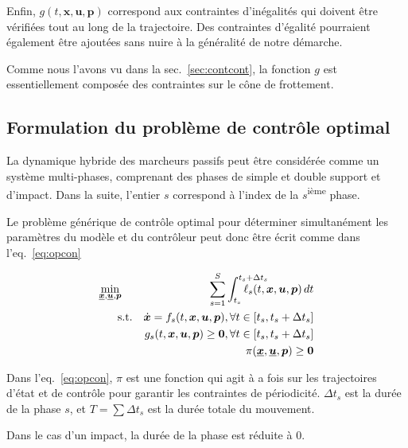 \documentclass[french,A4paper,]{book}
\begin{document}
Enfin, \(g(t, \bm x, \bm u, \bm p)\) correspond aux contraintes
d'inégalités qui doivent être vérifiées tout au long de la trajectoire.
Des contraintes d'égalité pourraient également être ajoutées sans nuire
à la généralité de notre démarche.

Comme nous l'avons vu dans la sec.~\ref{sec:contcont}, la fonction \(g\)
est essentiellement composée des contraintes sur le cône de frottement.

\subsection{Formulation du problème de contrôle
optimal}\label{formulation-du-probluxe8me-de-contruxf4le-optimal}

La dynamique hybride des marcheurs passifs peut être considérée comme un
système multi-phases, comprenant des phases de simple et double support
et d'impact. Dans la suite, l'entier \(s\) correspond à l'index de la
\(s\)\textsuperscript{ième} phase.

Le problème générique de contrôle optimal pour déterminer simultanément
les paramètres du modèle et du contrôleur peut donc être écrit comme
dans l'eq.~\ref{eq:opcon}

\begin{equation}\begin{aligned}
\underset{\substack{\hspace{0em} \underline{\bm x}, \underline{\bm u}, \bm p}}{\min } \ \ \
& & \hspace{2em} {\sum_{s=1}^S} \int_{t_{s}}^{t_{s}+\Delta t_s\hspace{-4em}} \ell_{s} (t,\bm x, \bm u,
\bm p) \, dt \\
\text{s.t.} & & \dot{\bm{x}} = f_{s}(t, \bm x, \bm u, \bm p), \forall t \in [t_{s},t_{s}+\Delta t_s] \\
& & g_{s}(t, \bm x, \bm u, \bm p) \geq \bm 0,  \forall t \in [t_{s},t_{s}+\Delta t_s] \\
& & \pi(\underline{\bm x}, \underline{\bm u}, \bm p) \geq \bm 0
\end{aligned} \label{eq:opcon}\end{equation}

Dans l'eq.~\ref{eq:opcon}, \(\pi\) est une fonction qui agit à a fois
sur les trajectoires d'état et de contrôle pour garantir les contraintes
de périodicité. \(\Delta t_s\) est la durée de la phase \(s\), et
\(T=\sum \Delta t_s\) est la durée totale du mouvement.

Dans le cas d'un impact, la durée de la phase est réduite à 0.
\end{document}

